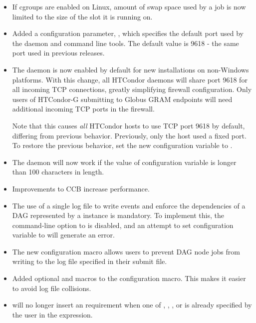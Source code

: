 \begin{itemize}

\item If cgroups are enabled on Linux, amount of swap space used by a
job is now limited to the  size of the slot
it is running on.

\item Added a configuration parameter, , which specifies
the default port used by the  daemon and command line tools.
The default value is 9618 - the same port used in previous releases.

\item The  daemon is now enabled by default 
for new installations on non-Windows platforms.
With this change, 
all HTCondor daemons will share port 9618 for all incoming TCP connections,
greatly simplifying firewall configuration.  
Only users of HTCondor-G submitting to Globus GRAM endpoints 
will need additional incoming TCP ports in the firewall.

Note that this causes \emph{all} HTCondor hosts to use 
TCP port 9618 by default,
differing from previous behavior.
Previously, only the  host used a fixed port.
To restore the previous behavior, 
set the new configuration variable  to .

\item The  daemon will now work 
if the value of configuration variable  is
longer than 100 characters in length.

\item Improvements to CCB increase performance.

\item The use of a single log file to write events and enforce the 
dependencies of a DAG represented by a  instance is mandatory.
To implement this,
the  command-line
option to  is disabled,
and an attempt to set configuration variable
 to  will generate an
error.

\item The new  configuration macro
 allows users to prevent DAG node
jobs from writing to the log file specified in their submit file.

\item Added optional  and  macros
to the  configuration macro.
This makes it easier to avoid log file collisions.

\item {} will no longer insert an  requirement
	when one of , , ,
	or  is already specified by the user in
	the  expression.

\end{itemize}

